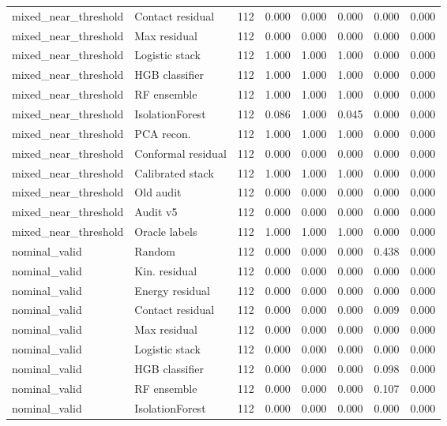 {\begin{longtable}{llrrrrrr}
mixed\_near\_threshold & Contact residual & 112 & 0.000 & 0.000 & 0.000 & 0.000 & 0.000 \\
mixed\_near\_threshold & Max residual & 112 & 0.000 & 0.000 & 0.000 & 0.000 & 0.000 \\
mixed\_near\_threshold & Logistic stack & 112 & 1.000 & 1.000 & 1.000 & 0.000 & 0.000 \\
mixed\_near\_threshold & HGB classifier & 112 & 1.000 & 1.000 & 1.000 & 0.000 & 0.000 \\
mixed\_near\_threshold & RF ensemble & 112 & 1.000 & 1.000 & 1.000 & 0.000 & 0.000 \\
mixed\_near\_threshold & IsolationForest & 112 & 0.086 & 1.000 & 0.045 & 0.000 & 0.000 \\
mixed\_near\_threshold & PCA recon. & 112 & 1.000 & 1.000 & 1.000 & 0.000 & 0.000 \\
mixed\_near\_threshold & Conformal residual & 112 & 0.000 & 0.000 & 0.000 & 0.000 & 0.000 \\
mixed\_near\_threshold & Calibrated stack & 112 & 1.000 & 1.000 & 1.000 & 0.000 & 0.000 \\
mixed\_near\_threshold & Old audit & 112 & 0.000 & 0.000 & 0.000 & 0.000 & 0.000 \\
mixed\_near\_threshold & Audit v5 & 112 & 0.000 & 0.000 & 0.000 & 0.000 & 0.000 \\
mixed\_near\_threshold & Oracle labels & 112 & 1.000 & 1.000 & 1.000 & 0.000 & 0.000 \\
nominal\_valid & Random & 112 & 0.000 & 0.000 & 0.000 & 0.438 & 0.000 \\
nominal\_valid & Kin. residual & 112 & 0.000 & 0.000 & 0.000 & 0.000 & 0.000 \\
nominal\_valid & Energy residual & 112 & 0.000 & 0.000 & 0.000 & 0.000 & 0.000 \\
nominal\_valid & Contact residual & 112 & 0.000 & 0.000 & 0.000 & 0.009 & 0.000 \\
nominal\_valid & Max residual & 112 & 0.000 & 0.000 & 0.000 & 0.000 & 0.000 \\
nominal\_valid & Logistic stack & 112 & 0.000 & 0.000 & 0.000 & 0.000 & 0.000 \\
nominal\_valid & HGB classifier & 112 & 0.000 & 0.000 & 0.000 & 0.098 & 0.000 \\
nominal\_valid & RF ensemble & 112 & 0.000 & 0.000 & 0.000 & 0.107 & 0.000 \\
nominal\_valid & IsolationForest & 112 & 0.000 & 0.000 & 0.000 & 0.000 & 0.000 \\

\end{longtable}}
